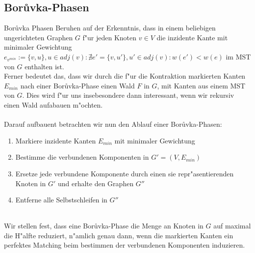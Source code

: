 \subsection{Bor\r uvka-Phasen}

Bor\r uvka Phasen Beruhen auf der Erkenntnis, dass in einem beliebigen 
    ungerichteten Graphen $G$ f"ur jeden Knoten $v \in V$ die inzidente Kante mit 
    minimaler Gewichtung 
    $e_{v^{min}} := \{v, u\}, u \in adj(v): 
        \nexists e' = \{v, u'\}, u' \in adj(v): w(e') < w(e)$
    im MST von $G$ enthalten ist.\\
Ferner bedeutet das, dass wir durch die f"ur die Kontraktion markierten Kanten
    $E_{min}$ nach einer Bor\r uvka-Phase einen Wald $F$ in $G$, mit Kanten aus 
    einem MST von $G$. Dies wird f"ur uns insebesondere dann interessant, wenn
    wir rekursiv einen Wald aufabauen m"ochten.\\
\\
Darauf aufbauent betrachten wir nun den Ablauf einer Bor\r uvka-Phasen:
\begin{enumerate}
    \item Markiere inzidente Kanten $E_{min}$ mit minimaler Gewichtung
    \item Bestimme die verbundenen Komponenten in $G' = (V,E_{min})$
    \item Ersetze jede verbundene Komponente durch einen sie repr"asentierenden
          Knoten in $G'$ und erhalte den Graphen $G''$
    \item Entferne alle Selbstschleifen in $G''$
\end{enumerate}
\ \\
Wir stellen fest, dass eine Bor\r uvka-Phase die Menge an Knoten in $G$ auf 
    maximal die H"alfte reduziert, n"amlich genau dann, wenn die markierten 
    Kanten ein perfektes Matching beim bestimmen der verbundenen Komponenten
    induzieren.\\
